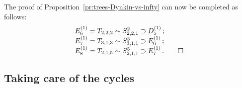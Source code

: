 \documentclass[letterpaper]{amsart}
\numberwithin{equation}{section}
\theoremstyle{definition}
\def\endproof{\hfill$\square$\medskip}
\begin{document}
The proof of Proposition~\ref{pr:trees-Dynkin-vs-infty} can now be 
completed as follows: 
\[ 
\begin{array}{l} 
E_6^{(1)} = T_{2,2,2} \sim S_{2,2,1}^2 \supset D_5^{(1)} \,;\\ 
E_7^{(1)} = T_{3,1,3} \sim S_{3,1,1}^3 \supset E_6^{(1)} \,;\\ 
E_8^{(1)} = T_{2,1,5} \sim S_{2,1,1}^5 \supset E_7^{(1)} \,. \qed 
\end{array} 
\] 
 
\subsection{Taking care of the cycles} 
\label{sec:take-care-of-cycles} 
 
\end{document}
